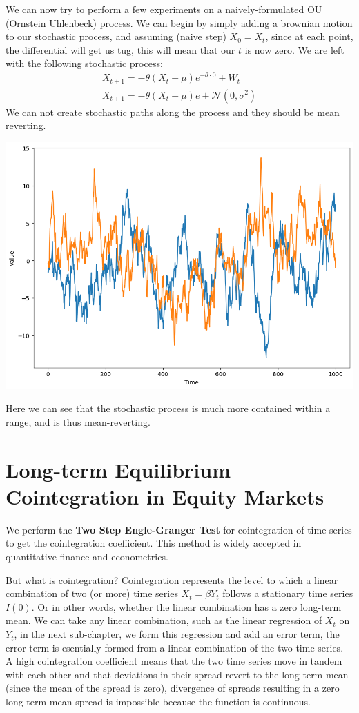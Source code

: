 \documentclass{article}
\begin{document}
\begin{spacing}{2.0}
We can now try to perform a few experiments on a naively-formulated OU (Ornstein Uhlenbeck) process. We can begin by simply adding a brownian motion to our stochastic
process, and assuming (naive step) $X_{0} = X_{t}$, since at each point, the differential will get us tug, this will mean that our $t$ is now zero.
We are left with the following stochastic process:
\begin{gather*}
    X_{t + 1} = -\theta(X_{t} - \mu)e^{-\theta \cdot 0} + W_{t} \\
    X_{t + 1} = -\theta(X_{t} - \mu)e + \mathcal{N}(0, \sigma^{2})
\end{gather*}
We can not create stochastic paths along the process and they should be mean reverting.
\begin{center}
    \includegraphics[scale=0.35]{./images/naive_ou.png}
\end{center}
Here we can see that the stochastic process is much more contained within a range, and is thus mean-reverting.

\section{Long-term Equilibrium Cointegration in Equity Markets}

We perform the \textbf{Two Step Engle-Granger Test} for cointegration of time series to get the cointegration coefficient. This method is widely accepted
in quantitative finance and econometrics.

But what is cointegration? Cointegration represents the level to which a linear combination
of two (or more) time series $X_{t} = \beta Y_{t}$ follows a stationary time series $I(0)$.
Or in other words, whether the linear combination has a zero long-term mean. We can take
any linear combination, such as the linear regression of $X_{t}$ on $Y_{t}$, in the next
sub-chapter, we form this regression and add an error term, the error term is esentially
formed from a linear combination of the two time series. A high cointegration coefficient
means that the two time series move in tandem with each other and that deviations in their
spread revert to the long-term mean (since the mean of the spread is zero), divergence of
spreads resulting in a zero long-term mean spread is impossible because the function is
continuous.


\end{spacing}
\end{document}

